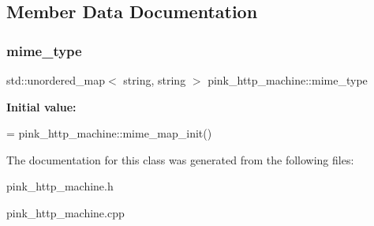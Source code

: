 \subsection{Member Data Documentation}
\mbox{\label{classpink__http__machine_a4373363c5bd675e182f502d300157aa9}} 
\subsubsection{\texorpdfstring{mime\+\_\+type}{mime\_type}}
{\footnotesize\ttfamily std\+::unordered\+\_\+map$<$ string, string $>$ pink\+\_\+http\+\_\+machine\+::mime\+\_\+type\hspace{0.3cm}{\ttfamily [static]}}

{\bfseries Initial value\+:}
\begin{DoxyCode}
= 
                                pink\_http\_machine::mime\_map\_init()
\end{DoxyCode}


The documentation for this class was generated from the following files\+:\begin{DoxyCompactItemize}
\item 
pink\+\_\+http\+\_\+machine.\+h\item 
pink\+\_\+http\+\_\+machine.\+cpp\end{DoxyCompactItemize}
